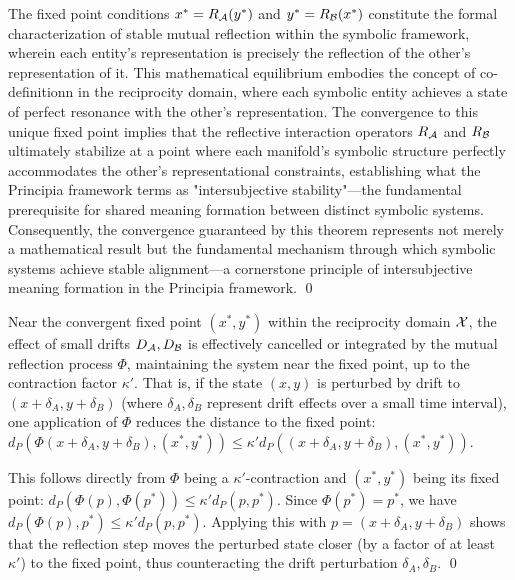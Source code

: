 \begin{demonstratio}
The fixed point conditions \(x^{\ast} = R_{\mathcal{A}}(y^{\ast})\) and \(y^{\ast} = R_{\mathcal{B}}(x^{\ast})\) constitute the formal characterization of stable mutual reflection within the symbolic framework, wherein each entity's representation is precisely the reflection of the other's representation of it. This mathematical equilibrium embodies the concept of co-definitionn in the reciprocity domain, where each symbolic entity achieves a state of perfect resonance with the other's representation. The convergence to this unique fixed point implies that the reflective interaction operators \(R_{\mathcal{A}}\) and \(R_{\mathcal{B}}\) ultimately stabilize at a point where each manifold's symbolic structure perfectly accommodates the other's representational constraints, establishing what the Principia framework terms as "intersubjective stability"—the fundamental prerequisite for shared meaning formation between distinct symbolic systems. Consequently, the convergence guaranteed by this theorem represents not merely a mathematical result but the fundamental mechanism through which symbolic systems achieve stable alignment—a cornerstone principle of intersubjective meaning formation in the Principia framework. \qed {}
\end{demonstratio}
\begin{corollary}
\label{corollary:bk7_stability_near_reciprocity}
Near the convergent fixed point \((x^{\ast}, y^{\ast})\) within the reciprocity domain \(\mathcal{X}\), the effect of small drifts \(D_{\mathcal{A}}, D_{\mathcal{B}}\) is effectively cancelled or integrated by the mutual reflection process \(\Phi\), maintaining the system near the fixed point, up to the contraction factor \(\kappa'\). That is, if the state \((x,y)\) is perturbed by drift to \((x+\delta_A, y+\delta_B)\) (where \(\delta_A, \delta_B\) represent drift effects over a small time interval), one application of \(\Phi\) reduces the distance to the fixed point: \(d_P(\Phi(x+\delta_A, y+\delta_B), (x^{\ast}, y^{\ast})) \le \kappa' d_P((x+\delta_A, y+\delta_B), (x^{\ast}, y^{\ast}))\).
\end{corollary}
\begin{demonstratio}
\label{demonstratio:bk7_perturbation_contraction_recovery}
This follows directly from \(\Phi\) being a \(\kappa'\)-contraction and \((x^{\ast}, y^{\ast})\) being its fixed point: \(d_P(\Phi(p), \Phi(p^*)) \le \kappa' d_P(p, p^*)\). Since \(\Phi(p^*) = p^*\), we have \(d_P(\Phi(p), p^*) \le \kappa' d_P(p, p^*)\). Applying this with \(p = (x+\delta_A, y+\delta_B)\) shows that the reflection step moves the perturbed state closer (by a factor of at least \(\kappa'\)) to the fixed point, thus counteracting the drift perturbation \(\delta_A, \delta_B\). \qed
\end{demonstratio}
